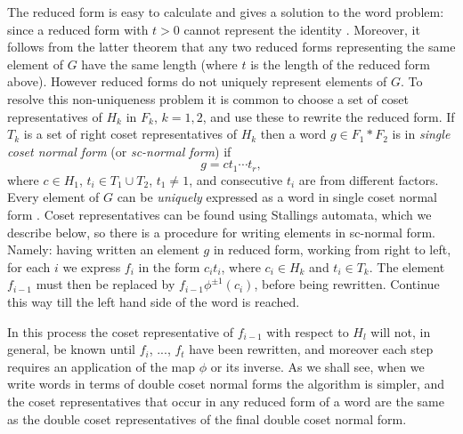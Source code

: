\documentclass[a4paper,12pt]{article}
\numberwithin{equation}{section}
\numberwithin{figure}{section}
\begin{document}
The reduced form is easy to calculate and gives a solution to the word problem: since
a reduced form with $t>0$ cannot represent the identity 
\cite[Chapter IV, Theorem 2.6]{LS}.
Moreover, it follows from the latter theorem that any two reduced 
forms representing the same element of $G$ have the same length (where 
$t$ is the length of the reduced form above). 
However reduced forms do not uniquely represent
 elements of $G$. To resolve this non-uniqueness problem it is common to
choose a set of coset representatives of $H_k$ in $F_k$, $k=1,2$, and use these to rewrite
the reduced form. If $T_k$ is a set of right coset representatives of $H_k$ then
 a word $g\in F_1\ast F_2$ is in \emph{single coset normal form} (or \emph{sc-normal
form}) if
\[g=ct_1\cdots t_r,\]
where $c\in H_1$, $t_i\in T_1\cup T_2$, $t_1\neq 1$, and consecutive $t_i$ are from
different factors. Every element of $G$ can be \emph{uniquely} expressed as a word in
single coset
normal form \cite[Theorem 4.4]{MKS}.
Coset representatives can be found using Stallings automata, which we describe below, so
there is a procedure for writing elements in sc-normal form. Namely:
having written an element $g$ in reduced form,
working from right to left, for each $i$
 we express $f_i$ in the
form $c_it_i$, where $c_i\in H_k$ and $t_i\in T_k$. The element $f_{i-1}$ must
then be replaced
by $f_{i-1}\phi^{\pm 1}(c_i)$, before being rewritten. Continue this way till the
left hand side of the word is reached.

In this process the coset representative of
$f_{i-1}$ with respect to $H_l$ will not, in general, be known
 until $f_i$, ..., $f_t$ have been rewritten, and moreover each step requires an
application
of the map $\phi$ or its inverse. As we shall see, when we write words in terms of
double
coset normal forms the algorithm is simpler, and the coset representatives that
occur in any reduced  form of a word are the same as
the double coset representatives of the final double coset normal form.
\end{document}
